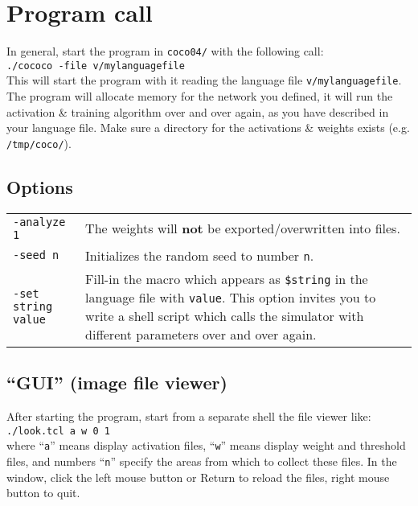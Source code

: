 \documentclass[12pt]{article}
\begin{document}
\section{Program call}

In general, start the program in \texttt{coco04/} with the following call:\\
\hspace*{11mm} \texttt{./cococo -file v/mylanguagefile} \\
This will start the program with it reading the language file \texttt{v/mylanguagefile}.
The program will allocate memory for the network you defined,
it will run the activation \& training algorithm over and over again, as you have described in your language file.
Make sure a directory for the activations \& weights exists (e.g. \texttt{/tmp/coco/}).

\subsection{Options}
\begin{tabular}{p{3.7cm}p{11.3cm}}
\texttt{-analyze 1}        & The weights will {\bf not} be exported/overwritten into files.\\
\texttt{-seed n}           & Initializes the random seed to number \texttt{n}.\\
\texttt{-set string value} & Fill-in the macro which appears as \texttt{\$string} in the language file with \texttt{value}.
                             This option invites you to write a shell script
                             which calls the simulator with different parameters over and over again.
\end{tabular}

\subsection{``GUI'' (image file viewer)} After starting the program, start from a separate shell the file viewer like:\\
\hspace*{11mm} \texttt{./look.tcl a w 0 1}\\
where ``\texttt{a}'' means display activation files,
``\texttt{w}'' means display weight and threshold files,
and numbers ``\texttt{n}'' specify the areas from which to collect these files.
In the window, click the left mouse button or Return to reload the files, right mouse button to quit.
\end{document}
